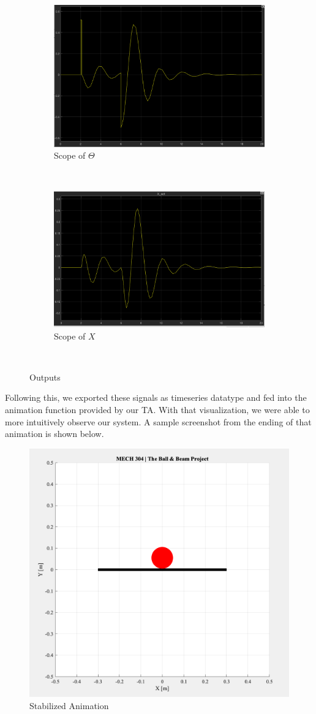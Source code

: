 \begin{figure}[H]
 \centering
\begin{subfigure}{.45\textwidth}
  \centering
  \includegraphics[width=.9\linewidth]{images/regular_theta.png}
  \caption{Scope of $\Theta$}
  \label{fig:x_d_norm}
\end{subfigure}%
~
\begin{subfigure}{.45\textwidth}
  \centering
  \includegraphics[width=.9\linewidth]{images/regular_x.png}
  \caption{Scope of $X$}
  \label{fig:x_d_norm_actual}
\end{subfigure}
~
\caption{Outputs}
\label{fig:outputs_theta_x}
\end{figure}


Following this, we exported these signals as timeseries datatype and fed into the animation function provided by our TA. With that visualization, we were able to more intuitively observe our system. A sample screenshot from the ending of that animation is shown below.

\begin{figure}[H]
    \centering
    \includegraphics[width=.7\textwidth]{images/anima.png}
    \caption{Stabilized Animation}
    \label{fig:anima}
\end{figure}
